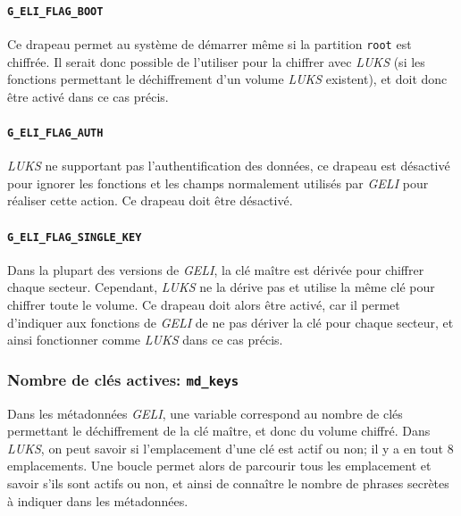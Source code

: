 \paragraph{\texttt{G\_ELI\_FLAG\_BOOT}}
Ce drapeau permet au système de démarrer même si la partition \texttt{root} est
chiffrée. Il serait donc possible de l'utiliser pour la chiffrer avec
\textit{LUKS} (si les fonctions permettant le déchiffrement d'un volume
\textit{LUKS} existent), et doit donc être activé dans ce cas précis.
\paragraph{\texttt{G\_ELI\_FLAG\_AUTH}}
\textit{LUKS} ne supportant pas l'authentification des données, ce drapeau est
désactivé pour ignorer les fonctions et les champs normalement utilisés par
\textit{GELI} pour réaliser cette action. Ce drapeau doit être désactivé.
\paragraph{\texttt{G\_ELI\_FLAG\_SINGLE\_KEY}}
Dans la plupart des versions de \textit{GELI}, la clé maître est dérivée pour
chiffrer chaque secteur. Cependant, \textit{LUKS} ne la dérive pas et utilise la
même clé pour chiffrer toute le volume. Ce drapeau doit alors être activé, car
il permet d'indiquer aux fonctions de \textit{GELI} de ne pas dériver la clé
pour chaque secteur, et ainsi fonctionner comme \textit{LUKS} dans ce cas
précis.

\subsubsection{Nombre de clés actives: \texttt{md\_keys}}
Dans les métadonnées \textit{GELI}, une variable correspond au nombre de clés
permettant le déchiffrement de la clé maître, et donc du volume chiffré. Dans
\textit{LUKS}, on peut savoir si l'emplacement d'une clé est actif ou non; il y
a en tout 8 emplacements. Une boucle permet alors de parcourir tous les
emplacement et savoir s'ils sont actifs ou non, et ainsi de connaître le nombre
de phrases secrètes à indiquer dans les métadonnées.
